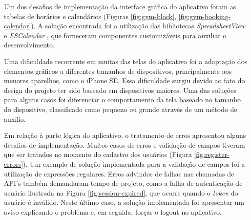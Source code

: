 Um dos desafios de implementação da interface gráfica do aplicativo foram as tabelas de horários e calendários (Figuras \ref{fig:gym-block}, \ref{fig:gym-booking-calendar}). A solução encontrada foi a utilização das bibliotecas \textit{SpreadsheetView} \cite{spreadsheet} e \textit{FSCalendar} \cite{fscalendar}, que forneceram componentes customizáveis para auxiliar o desenvolvimento.

Uma dificuldade recorrente em muitas das telas do aplicativo foi a adaptação dos elementos gráficos a diferentes tamanhos de dispositivos, principalmente aos menores aparelhos, como o iPhone SE. Essa dificuldade surgiu devido ao fato do design do projeto ter sido baseado em dispositivos maiores. Uma das soluções para alguns casos foi diferenciar o comportamento da tela baseado no tamanho do dispositivo, classificado como pequeno ou grande através de um método de auxílio.

Em relação à parte lógica do aplicativo, o tratamento de erros apresentou alguns desafios de implementação. Muitos casos de erros e validação de campos tiveram que ser tratados no momento do cadastro dos usuários (Figura \ref{fig:register-errors}). Um exemplo de solução implementada para a validação de campos foi a utilização de expressões regulares. Erros advindos de falhas nas chamadas de API's também demandaram tempo de projeto, como a falha de autenticação de usuário ilustrada na Figura \ref{fig:session-expired}, que ocorre quando o \textit{token} do usuário é inválido. Neste último caso, a solução implementada foi apresentar um aviso explicando o problema e, em seguida, forçar o logout no aplicativo.

